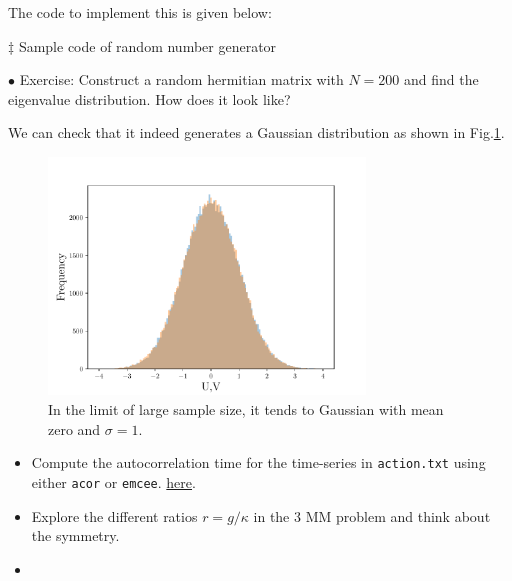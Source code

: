 \documentclass[11pt]{article}
\begin{document}
The code to implement this is given below: 


\vspace{10mm} 
\noindent $\ddagger$ Sample code of random number generator
\begin{mdframed}[backgroundcolor=cyan!1] 

\end{mdframed} 


\begin{mdframed}[backgroundcolor=blue!3] 
	\textsc{} 
	$\bullet$ Exercise: Construct a random hermitian matrix with $N = 200$ and find the eigenvalue distribution. How does it look like?
\end{mdframed} 





We can check that it indeed generates a Gaussian distribution as shown in Fig.\ref{fig:RN}. 


\begin{figure}[htbp] 
	\centering 
	\includegraphics[width=0.75\textwidth]{figs/testRN.pdf}
	\caption{\label{fig:RN}In the limit of large sample size, it tends to Gaussian with mean zero and $\sigma=1$.}
\end{figure}




\begin{itemize} 
\item Compute the autocorrelation time for the time-series in \texttt{action.txt}
using either \texttt{acor} or \texttt{emcee}. 
\href{https://github.com/rgjha/TensorCodes/blob/master/2d_trg.py}
{here}. 
\item Explore the different ratios $r = g/\kappa$ in the 3 MM problem and think about the symmetry. 
\item 
\end{itemize} 
\end{document}
